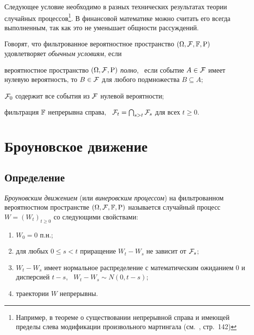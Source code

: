 Следующее условие необходимо в разных технических результатах теории случайных процессов\footnote{Например, в теореме о существовании непрерывной справа и имеющей пределы слева модификации произвольного мартингала (см.~\cite{BulinskiShiryaev04}, стр.~142)}.
В финансовой математике можно считать его всегда выполненным, так как это не уменьшает общности рассуждений.

\begin{definition}[$*$]
Говорят, что фильтрованное вероятностное пространство $(\Omega,\mathcal{F},\mathbb{F},\mathrm{P})$ удовлетворяет \emph{обычным условиям}, если
\begin{alphenum}
\item вероятностное пространство $(\Omega,\mathcal{F},\mathrm{P})$ \emph{полно}, \te\ если событие $A\in\mathcal{F}$ имеет нулевую вероятность, то $B\in\mathcal{F}$ для любого подмножества $B\subseteq A$;
\item $\mathcal{F}_0$ содержит все события из $\mathcal{F}$ нулевой вероятности;
\item фильтрация $\mathbb{F}$ непрерывна справа, \te\ $\mathcal{F}_t = \bigcap_{s>t} \mathcal{F}_s$ для всех $t\ge0$.
\end{alphenum}
\end{definition}


\section{Броуновское движение}
\subsection{Определение}

\begin{definition}
\emph{Броуновским движением} (или \emph{винеровским процессом}) на фильтрованном вероятностном пространстве $(\Omega,\mathcal{F},\mathbb{F},\mathrm{P})$ называется случайный процесс $W=(W_t)_{t\ge0}$ со следующими свойствами:
\begin{enumerate}
\item $W_0=0$ п.н.;
\item для любых $0\le s<t$ приращение $W_t-W_s$ не зависит от $\mathcal{F}_s$;
\item $W_t-W_s$ имеет нормальное распределение с математическим ожиданием 0 и дисперсией $t-s$, \te\ $W_t-W_s\sim N(0,t-s)$;
\item траектории $W$ непрерывны.
\end{enumerate}
\end{definition}

